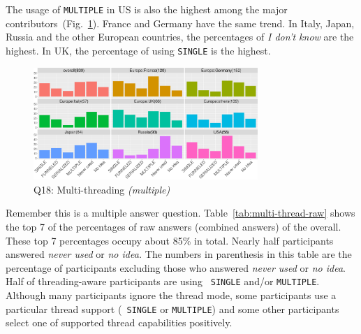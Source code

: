 \documentclass[preprint,5p,times]{elsarticle}
\def\myquote#1{{\it #1}}
\def\mcountries{major contributors\xspace{}}%
\begin{document}
The usage of {\tt MULTIPLE} in US is also the highest among the
\mcountries\  (Fig.~\ref{fig:multi-thread}). France and Germany have
the same trend. In Italy, Japan, Russia and the
other European countries, the percentages of \myquote{I don't know}
are the highest. In UK, the percentage of using {\tt SINGLE} is the
highest.

\begin{figure}[htb]
  \begin{center}
    \includegraphics[width=8.5cm]{R-scripts/Q18.pdf}
    \caption{Q18: Multi-threading {\it(multiple)}}
    \label{fig:multi-thread}
  \end{center}
\end{figure}

Remember this is a multiple answer
question. Table~\ref{tab:multi-thread-raw} shows the top 7 of the
percentages of raw answers (combined answers) of the
overall. These top 7 percentages occupy about 85\% in
total. Nearly half
participants answered \myquote{never used} or \myquote{no idea.} The
numbers in parenthesis in this table are the percentage of
participants excluding those who answered \myquote{never used} or
\myquote{no idea}. Half of threading-aware participants are using {\tt
  SINGLE}
and/or {\tt MULTIPLE}. Although many participants ignore the thread
mode, some participants use a particular thread support ({\tt
  SINGLE} or {\tt MULTIPLE}) and some other participants select one of
supported thread capabilities positively.
\end{document}
